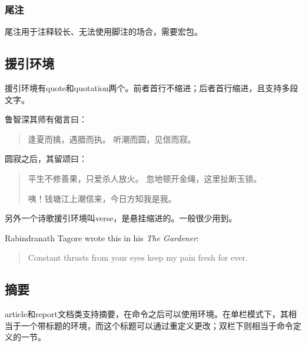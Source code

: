 \subsubsection{尾注}
尾注用于注释较长、无法使用脚注的场合，需要宏包。

\subsection{援引环境}
援引环境有quote和quotation两个。前者首行不缩进；后者首行缩进，且支持多段文字。

\begin{codeshow}
鲁智深其师有偈言曰：
\begin{quote}
逢夏而擒，遇腊而执。
听潮而圆，见信而寂。
\end{quote}
圆寂之后，其留颂曰：
\begin{quotation}
平生不修善果，只爱杀人放火。
忽地顿开金绳，这里扯断玉锁。

咦！钱塘江上潮信来，今日方知我是我。
\end{quotation}
\end{codeshow}

另外一个诗歌援引环境叫verse，\label{envi:verse}是悬挂缩进的。一般很少用到。

\begin{codeshow}
Rabindranath Tagore wrote this in 
his \emph{The Gardener}: 
\begin{verse}
Constant thrusts from your eyes
keep my pain fresh for ever.
\end{verse}
\end{codeshow}

\subsection{摘要}
article和report文档类支持摘要，在命令之后可以使用环境。在单栏模式下，其相当于一个带标题的环境，而这个标题可以通过重定义更改；双栏下则相当于命令定义的一节。

